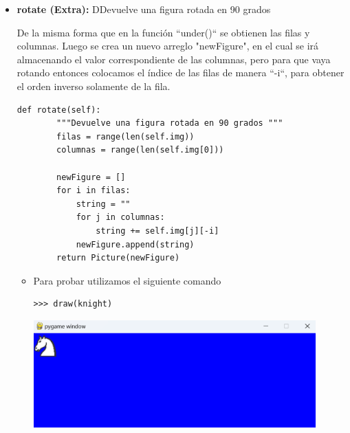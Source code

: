 \documentclass{article}
\begin{document}
\begin{itemize}
  \pagebreak

  \item \textbf{rotate (Extra):} DDevuelve una figura rotada en 90 grados

  \vspace{\baselineskip}

  De la misma forma que en la función ``under()`` se obtienen las filas y columnas. Luego se crea un nuevo arreglo "newFigure", en el cual se irá almacenando el valor correspondiente de las columnas, pero para que vaya rotando entonces colocamos el índice de las filas de manera ``-i``, para obtener el orden inverso solamente de la fila.

    \begin{lstlisting}[style=python]
    def rotate(self):
        """Devuelve una figura rotada en 90 grados """
        filas = range(len(self.img))
        columnas = range(len(self.img[0]))

        newFigure = []
        for i in filas:
            string = ""
            for j in columnas:
                string += self.img[j][-i]
            newFigure.append(string)
        return Picture(newFigure)
    \end{lstlisting}

    \vspace{\baselineskip}

    \begin{itemize}
      \item Para probar utilizamos el siguiente comando

      \begin{lstlisting}[style=shell]
      >>> draw(knight)
      \end{lstlisting}
      \begin{minipage}{\linewidth}
        \centering
        \includegraphics[width=0.9\textwidth]{imagenes/p_rotate1.png}
      \end{minipage}

      \vspace{2\baselineskip}


\end{itemize}
\end{itemize}
\end{document}
